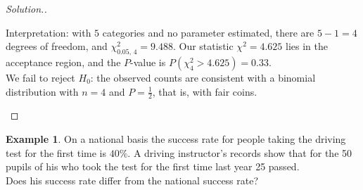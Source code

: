 \documentclass[11pt,a4paper]{article}
\theoremstyle{definition}
\newtheorem{example}[thm]{Example}
\newenvironment{solution}
  {\renewcommand{\qedsymbol}{}\begin{proof}[\textit{Solution}.]}
  {\end{proof}}
\begin{document}
\begin{solution}
\begin{enumerate}
Interpretation: with $5$ categories and no parameter estimated, there are $5-1=4$ degrees of freedom, and $\chi^2_{0.05,\,4}=9.488$. Our statistic $\chi^2=4.625$ lies in the acceptance region, and the $P$-value is $P(\chi^2_4>4.625)=0.33$.\\[1ex]
We fail to reject $H_0$: the observed counts are consistent with a binomial distribution with $n=4$ and $P=\frac12$, that is, with fair coins.\\
\end{enumerate}
\end{solution}



\begin{example}
On a national basis the success rate for people taking the driving test for the first time is $40\%$. A driving instructor's records show that for the 50 pupils of his who took the test for the first time last year 25 passed.\\ Does his success rate differ from the national success rate?\\
\end{example}
\end{document}
